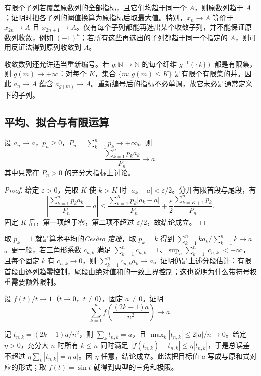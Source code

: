 有限个子列若覆盖原数列的全部指标，且它们均趋于同一个 $A$，则原数列趋于 $A$；证明时把各子列的阈值换算为原指标后取最大值。特别，$x_n\to A$ 等价于 $x_{2n}\to A$ 且 $x_{2n+1}\to A$。仅有每个子列都能再选出某个收敛子列，并不能保证原数列收敛，例如 $(-1)^n$；若所有这些再选出的子列都趋于同一个指定的 $A$，则可用反证法得到原列收敛到 $A$。

收敛数列还允许适当重新编号。若 $g:\mathbb{N}\to\mathbb{N}$ 的每个纤维 $g^{-1}(\{k\})$ 都是有限集，则 $g(m)\to+\infty$：对每个 $K$，集合 $\{m:g(m)\le K\}$ 是有限个有限集的并。因此 $a_n\to A$ 蕴含 $a_{g(m)}\to A$。重新编号后的指标不必单调，故它未必是通常定义下的子列。

\subsection{平均、拟合与有限运算}

\begin{theorem}[加权平均保持极限]
\label{thm:pei-weighted-cesaro}
设 $a_n\to a$，$p_n\ge0$，$P_n=\sum_{k=1}^np_k\to+\infty$。则
\begin{equation}
    \frac{\sum_{k=1}^np_ka_k}{P_n}\longrightarrow a.
    \label{eq:pei-weighted-cesaro}
\end{equation}
其中只需在 $P_n>0$ 的充分大指标上讨论。
\end{theorem}
\begin{proof}
给定 $\varepsilon>0$，先取 $K$ 使 $k>K$ 时 $|a_k-a|<\varepsilon/2$。分开有限首段与尾段，有
\[
    \left|\frac{\sum_{k=1}^np_ka_k}{P_n}-a\right|
    \le\frac{\sum_{k=1}^Kp_k|a_k-a|}{P_n}
       +\frac\varepsilon2\frac{\sum_{k=K+1}^np_k}{P_n}.
\]
固定 $K$ 后，第一项趋于零，第二项不超过 $\varepsilon/2$，故结论成立。
\end{proof}

取 $p_k=1$ 就是算术平均的\emph{Cesàro 定理}，取 $p_k=k$ 得到 $\sum_{k=1}^nka_k/\sum_{k=1}^nk\to a$。更一般，若三角形系数 $c_{n,k}$ 满足 $\sum_{k=1}^nc_{n,k}=1$、$\sup_n\sum_{k=1}^n|c_{n,k}|<+\infty$，且每个固定 $k$ 有 $c_{n,k}\to0$，则 $\sum_{k=1}^nc_{n,k}a_k\to a$。证明仍是上述分段估计：有限首段由逐列趋零控制，尾段由绝对值和的一致上界控制；这也说明为什么带符号权重需要额外限制。

\begin{example}
\label{ex:pei-fitting-sine}
设 $f(t)/t\to1$（$t\to0$，$t\ne0$），固定 $a\ne0$。证明
\[
    \sum_{k=1}^nf\left(\frac{(2k-1)a}{n^2}\right)\longrightarrow a.
\]
\end{example}
\begin{solve}
记 $t_{n,k}=(2k-1)a/n^2$，则 $\sum_kt_{n,k}=a$，且 $\max_k|t_{n,k}|\le2|a|/n\to0$。给定 $\eta>0$，充分大 $n$ 时所有 $k\le n$ 同时满足 $|f(t_{n,k})-t_{n,k}|\le\eta|t_{n,k}|$，于是总误差不超过 $\eta\sum_k|t_{n,k}|=\eta|a|$。因 $\eta$ 任意，结论成立。此法把目标值 $a$ 写成与原和式对应的形式；取 $f(t)=\sin t$ 就得到典型的三角和极限。
\end{solve}

